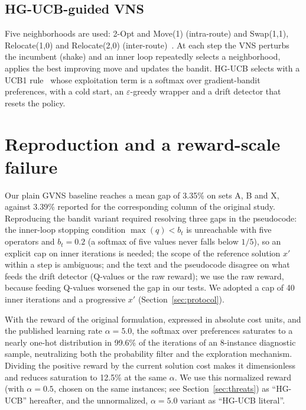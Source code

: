 \documentclass[conference]{IEEEtran}
\begin{document}
\subsection{HG-UCB-guided VNS}
Five neighborhoods are used: 2-Opt and Move(1) (intra-route) and Swap(1,1), Relocate(1,0) and Relocate(2,0) (inter-route)~\cite{kalatzantonakis2023}. At each step the VNS perturbs the incumbent (shake) and an inner loop repeatedly selects a neighborhood, applies the best improving move and updates the bandit. HG-UCB selects with a UCB1 rule~\cite{auer2002} whose exploitation term is a softmax over gradient-bandit preferences, with a cold start, an $\varepsilon$-greedy wrapper and a drift detector that resets the policy.

\section{Reproduction and a reward-scale failure}\label{sec:repro}
Our plain GVNS baseline reaches a mean gap of 3.35\% on sets A, B and X, against 3.39\% reported for the corresponding column of the original study. Reproducing the bandit variant required resolving three gaps in the pseudocode: the inner-loop stopping condition $\max(q)<b_t$ is unreachable with five operators and $b_t=0.2$ (a softmax of five values never falls below $1/5$), so an explicit cap on inner iterations is needed; the scope of the reference solution $x'$ within a step is ambiguous; and the text and the pseudocode disagree on what feeds the drift detector (Q-values or the raw reward); we use the raw reward, because feeding Q-values worsened the gap in our tests. We adopted a cap of 40 inner iterations and a progressive $x'$ (Section~\ref{sec:protocol}).

With the reward of the original formulation, expressed in absolute cost units, and the published learning rate $\alpha=5.0$, the softmax over preferences saturates to a nearly one-hot distribution in 99.6\% of the iterations of an 8-instance diagnostic sample, neutralizing both the probability filter and the exploration mechanism. Dividing the positive reward by the current solution cost makes it dimensionless and reduces saturation to 12.5\% at the same $\alpha$. We use this normalized reward (with $\alpha=0.5$, chosen on the same instances; see Section~\ref{sec:threats}) as ``HG-UCB'' hereafter, and the unnormalized, $\alpha=5.0$ variant as ``HG-UCB literal''.
\end{document}
